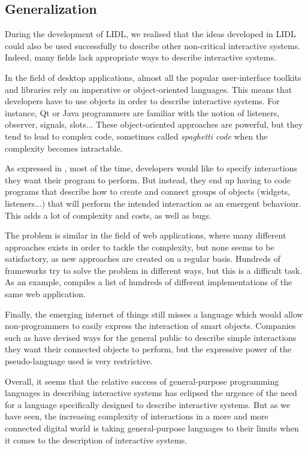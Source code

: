 \documentclass[10pt]{sigplanconf}
\begin{document}
\subsection{Generalization}

During the development of LIDL, we realised that the ideas developed in LIDL could also be used successfully to describe other non-critical interactive systems. Indeed, many fields lack appropriate ways to describe interactive systems. 

In the field of desktop applications, almost all the popular user-interface toolkits and libraries rely on imperative or object-oriented languages. This means that developers have to use objects in order to describe interactive systems. For instance, Qt or Java programmers are familiar with the notion of listeners, observer, signals, slots... These object-oriented approaches are powerful, but they tend to lead to complex code, sometimes called \emph{spaghetti code} when the complexity becomes intractable.

As expressed in \cite{chatty2007}, most of the time, developers would like to specify interactions they want their program to perform. But  instead, they end up having to code programs that describe how to create and connect groups of objects (widgets, listeners...) that will perform the intended interaction as an emergent behaviour. This adds a lot of complexity and costs, as well as bugs.
  
The problem is similar in the field of web applications, where many different approaches exists in order to tackle the complexity, but none seems to be satisfactory, as new approaches are created on a regular basis. Hundreds of frameworks try to solve the problem in different ways, but this is a difficult task. As an example, \cite{todomvc} compiles a list of hundreds of different implementations of the same web application. 

Finally, the emerging internet of things still misses a language which would allow non-programmers to easily express the interaction of smart objects. Companies such as \cite{ifttt} have devised ways for the general public to describe simple interactions they want their connected objects to perform, but the expressive power of the pseudo-language used is very restrictive.

Overall, it seems that the relative success of general-purpose programming languages in describing interactive systems has eclipsed the urgence of the need for a language specifically designed to describe interactive systems. But as we have seen, the increasing complexity of interactions in a more and more connected digital world is taking general-purpose languages to their limits when it comes to the description of interactive systems.
\end{document}
